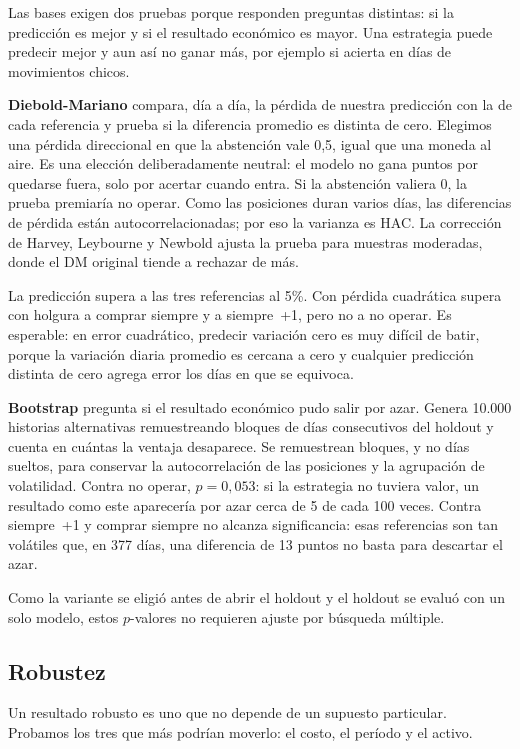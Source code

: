\documentclass[10pt,a4paper]{article}
\begin{document}
Las bases exigen dos pruebas porque responden preguntas distintas: si la
predicción es mejor y si el resultado económico es mayor. Una estrategia puede
predecir mejor y aun así no ganar más, por ejemplo si acierta en días de
movimientos chicos.

\textbf{Diebold-Mariano} \citep{dm1995} compara, día a día, la pérdida de nuestra
predicción con la de cada referencia y prueba si la diferencia promedio es
distinta de cero. Elegimos una pérdida direccional en que la abstención vale 0,5,
igual que una moneda al aire. Es una elección deliberadamente neutral: el modelo no
gana puntos por quedarse fuera, solo por acertar cuando entra. Si la abstención
valiera 0, la prueba premiaría no operar. Como las posiciones duran varios días,
las diferencias de pérdida están autocorrelacionadas; por eso la varianza es HAC.
La corrección de Harvey, Leybourne y Newbold ajusta la prueba para muestras
moderadas, donde el DM original tiende a rechazar de más.

La predicción supera a las tres referencias al 5\%. Con pérdida cuadrática supera
con holgura a comprar siempre y a siempre~+1, pero no a no operar. Es esperable: en
error cuadrático, predecir variación cero es muy difícil de batir, porque la
variación diaria promedio es cercana a cero y cualquier predicción distinta de
cero agrega error los días en que se equivoca.

\textbf{Bootstrap} pregunta si el resultado económico pudo salir por azar. Genera
10.000 historias alternativas remuestreando bloques de días consecutivos del
holdout y cuenta en cuántas la ventaja desaparece. Se remuestrean bloques, y no
días sueltos, para conservar la autocorrelación de las posiciones y la
agrupación de volatilidad. Contra no operar, $p=0{,}053$: si la estrategia no
tuviera valor, un resultado como este aparecería por azar cerca de 5 de cada 100
veces. Contra siempre~+1 y comprar siempre no alcanza significancia: esas
referencias son tan volátiles que, en 377 días, una diferencia de 13 puntos no
basta para descartar el azar.

Como la variante se eligió antes de abrir el holdout y el holdout se evaluó con un
solo modelo, estos $p$-valores no requieren ajuste por búsqueda múltiple.

\subsection{Robustez}\label{sec:robustez}

Un resultado robusto es uno que no depende de un supuesto particular. Probamos los
tres que más podrían moverlo: el costo, el período y el activo.
\end{document}
